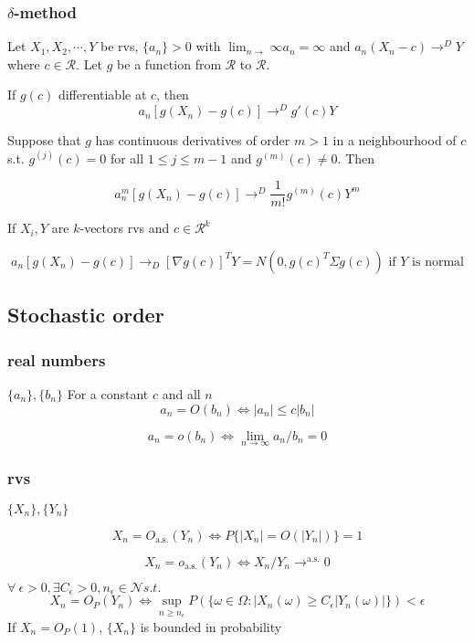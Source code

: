 \subsubsection{$\delta$-method} Let $X_1, X_2, \cdots, Y$ be rvs, $\{a_n\} > 0$ with $\lim_{n\rightarrow}\infty a_n = \infty$ and $a_n(X_n-c)\rightarrow^D Y$ where $c\in\mathcal{R}$. Let $g$ be a function from $\mathcal{R}$ to $\mathcal{R}$.

If $g(c)$ differentiable at $c$, then
$$
a_n[g(X_n) - g(c)]\rightarrow^D g'(c) Y
$$

Suppose that $g$ has continuous derivatives of order $m > 1$ in a neighbourhood of $c$ s.t. $g^{(j)}(c) = 0$ for all $1\leq j \leq m-1$ and $g^{(m)}(c) \neq 0$. Then

$$
a_n^m [g(X_n)-g(c)]\rightarrow^D \frac{1}{m!}g^{(m)}(c) Y^m
$$

If $X_i, Y$ are $k$-vectors rvs and $c\in\mathcal{R}^k$

$$
a_n[g(X_n)-g(c)]\rightarrow_D [\nabla g(c)]^T Y = N\left(0, g(c)^T \Sigma g(c)\right) \text{ if $Y$ is normal}
$$

\subsection{Stochastic order}

\subsubsection{real numbers}

$\{a_n\}, \{b_n\}$
For a constant $c$ and all $n$
$$
a_n=O(b_n)\Leftrightarrow |a_n| \leq c|b_n|
$$

$$
a_n=o(b_n) \Leftrightarrow \lim_{n\rightarrow\infty}a_n/b_n = 0
$$

\subsubsection{rvs}
$\{X_n\}, \{Y_n\}$

$$
X_n = O_{\text{a.s.}}(Y_n) \Leftrightarrow P\{|X_n|=O(|Y_n|)\}=1
$$

$$
X_n = o_{\text{a.s.}}(Y_n) \Leftrightarrow X_n/Y_n\rightarrow^{\text{a.s.}}0
$$

$\forall~\epsilon>0, \exists C_\epsilon > 0, n_\epsilon \in \mathcal{N} s.t.$
$$
X_n = O_P(Y_n) \Leftrightarrow \sup_{n\geq n_\epsilon} P\left(\{
\omega\in\Omega: |X_n(\omega)\geq C_\epsilon |Y_n(\omega)|
\}\right) < \epsilon
$$
If $X_n = O_P(1)$, $\{X_n\}$ is bounded in probability

